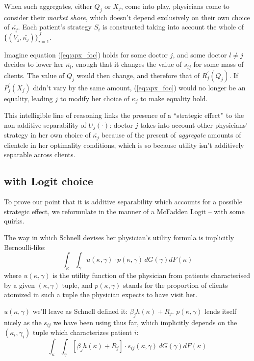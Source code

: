 \documentclass[../main.tex]{subfiles}
\begin{document}
When such aggregates, either $Q_j$ or $X_j$, come into play, physicians come to consider their \textit{market share}, which doesn't depend exclusively on their own choice of $\bar{\kappa_j}$. Each patient's strategy $S_i$ is constructed taking into account the whole of $\{(V_j,\bar{\kappa_j})\}_{i =1}^{J}$.

Imagine equation (\ref{eq:apx_foc}) holds for some doctor $j$, and some doctor $l \neq j$ decides to lower her $\bar{\kappa_l}$, enough that it changes the value of $s_{ij}$ for some mass of clients. The value of $Q_j$ would then change, and therefore that of $ R_j^{\prime}(Q_j)$. If $P_j^{\prime}(X_j)$ didn't vary by the same amount, (\ref{eq:apx_foc}) would no longer be an equality, leading $j$ to modify her choice of $\bar{\kappa_j}$ to make equality hold.

This intelligible line of reasoning links the presence of a ``strategic effect'' to the non-additive separability of $U_j(\cdot)$: doctor $j$ takes into account other physicians' strategy in her own choice of $ \bar{\kappa_j}$ because of the present of \textit{aggregate} amounts of clientele in her optimality conditions, which is so because utility isn't additively separable across clients.

\subsection{\cite{schnell2017physician} with Logit choice}
\label{sec:schnell_logit}

To prove our point that it is additive separability which accounts for a possible strategic effect, we reformulate \cite{schnell2017physician} in the manner of a McFadden Logit -- with some quirks.

The way in which Schnell devises her physician's utility formula is implicitly Bernoulli-like:
\[
\int_{\kappa} \int_{\gamma} u(\kappa, \gamma) \cdot p(\kappa, \gamma) \, dG(\gamma) dF(\kappa)
\]
where $u(\kappa, \gamma)$ is the utility function of the physician from patients characterised by a given $(\kappa, \gamma)$ tuple, and $p(\kappa, \gamma)$ stands for the proportion of clients atomized in such a tuple the physician expects to have visit her.

$u(\kappa, \gamma)$ we'll leave as Schnell defined it: $\beta_j h(\kappa) + R_j$. $p(\kappa, \gamma)$ lends itself nicely as the $s_{ij}$ we have been using thus far, which implicitly depends on the $(\kappa_i, \gamma_i)$ tuple which characterizes patient $i$:
\[
\int_{\kappa} \int_{\gamma} [\beta_j h(\kappa) + R_j] \cdot s_{ij}(\kappa, \gamma) \, dG(\gamma) dF(\kappa)
\]
\end{document}
